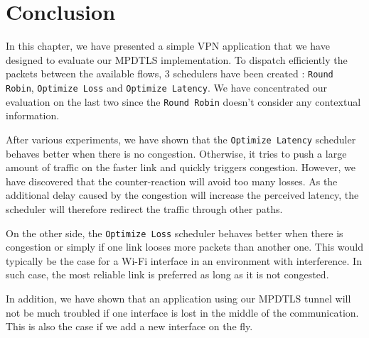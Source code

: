 \section{Conclusion}

In this chapter, we have presented a simple VPN application that we have designed to evaluate our MPDTLS implementation. To dispatch efficiently the packets between the available flows, 3 schedulers have been created : \texttt{Round Robin}, \texttt{Optimize Loss} and \texttt{Optimize Latency}. We have concentrated our evaluation on the last two since the \texttt{Round Robin} doesn't consider any contextual information. 

After various experiments, we have shown that the \texttt{Optimize Latency} scheduler behaves better when there is no congestion. Otherwise, it tries to push a large amount of traffic on the faster link and quickly triggers congestion. However, we have discovered that the counter-reaction will avoid too many losses. As the additional delay caused by the congestion will increase the perceived latency, the scheduler will therefore redirect the traffic through other paths.

On the other side, the \texttt{Optimize Loss} scheduler behaves better when there is congestion or simply if one link looses more packets than another one. This would typically be the case for a Wi-Fi interface in an environment with interference. In such case, the most reliable link is preferred as long as it is not congested.

In addition, we have shown that an application using our MPDTLS tunnel will not be much troubled if one interface is lost in the middle of the communication. This is also the case if we add a new interface on the fly.






 